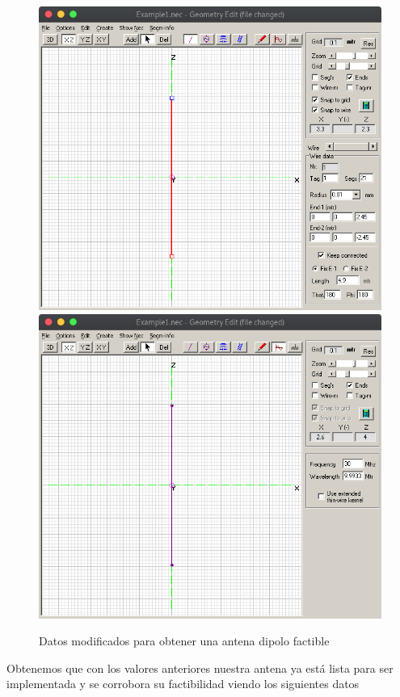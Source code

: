 \documentclass[11pt,a4paper]{article}
\begin{document}
    \begin{figure}[H]
    \centering
    \includegraphics[scale=0.35]{images/dipolo/1dipolo.png}
    \includegraphics[scale=0.35]{images/dipolo/2dipolo.png}
    \caption{Datos modificados para obtener una antena dipolo factible}
    \label{fig3:yagui2d}
    \end{figure}

Obtenemos que con los valores anteriores nuestra antena ya est\'a lista para ser implementada y se corrobora su factibilidad viendo los siguientes datos
\end{document}
